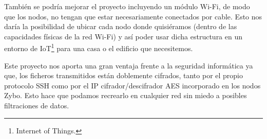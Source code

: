 También se podría mejorar el proyecto incluyendo un módulo Wi-Fi, de modo que los nodos, no tengan que estar necesariamente conectados por cable. Esto nos daría la posibilidad de ubicar cada nodo donde quisiéramos (dentro de las capacidades físicas de la red Wi-Fi) y así poder usar dicha estructura en un entorno de IoT\footnote{Internet of Things.} para una casa o el edificio que necesitemos.

Este proyecto nos aporta una gran ventaja frente a la seguridad informática ya que, los ficheros transmitidos están doblemente cifrados, tanto por el propio protocolo SSH como por el IP cifrador/descifrador AES incorporado en los nodos Zybo. Esto hace que podamos recrearlo en cualquier red sin miedo a posibles filtraciones de datos.